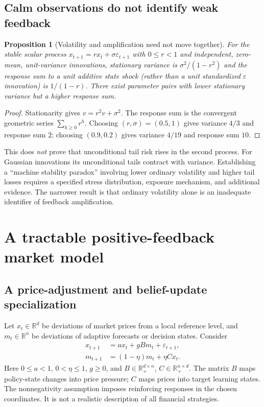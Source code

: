 \documentclass[11pt,a4paper]{article}
\newtheorem{proposition}[theorem]{Proposition}
\theoremstyle{definition}
\theoremstyle{remark}
\newcommand{\R}{\mathbb{R}}
\begin{document}
\subsection{Calm observations do not identify weak feedback}
\begin{proposition}[Volatility and amplification need not move together]
\label{prop:vol}
For the stable scalar process $x_{t+1}=r x_t+\sigma\varepsilon_{t+1}$ with $0\leq r<1$ and independent, zero-mean, unit-variance innovations, stationary variance is $\sigma^2/(1-r^2)$ and the response sum to a unit additive state shock (rather than a unit standardized $\varepsilon$ innovation) is $1/(1-r)$. There exist parameter pairs with lower stationary variance but a higher response sum.
\end{proposition}
\begin{proof}
Stationarity gives $v=r^2v+\sigma^2$. The response sum is the convergent geometric series $\sum_{h\geq0}r^h$. Choosing $(r,\sigma)=(0.5,1)$ gives variance $4/3$ and response sum $2$; choosing $(0.9,0.2)$ gives variance $4/19$ and response sum $10$.
\end{proof}
This does \emph{not} prove that unconditional tail risk rises in the second process. For Gaussian innovations its unconditional tails contract with variance. Establishing a ``machine stability paradox'' involving lower ordinary volatility and higher tail losses requires a specified stress distribution, exposure mechanism, and additional evidence. The narrower result is that ordinary volatility alone is an inadequate identifier of feedback amplification.

\section{A tractable positive-feedback market model}
\label{sec:positive}
\subsection{A price-adjustment and belief-update specialization}
Let $x_t\in\R^d$ be deviations of market prices from a local reference level, and $m_t\in\R^n$ be deviations of adaptive forecasts or decision states. Consider
\begin{align}
 x_{t+1}&=a x_t+gB m_t+\varepsilon_{t+1},\label{eq:positiveprice}\\
 m_{t+1}&=(1-\eta)m_t+\eta C x_t.\label{eq:positivememory}
\end{align}
Here $0\leq a<1$, $0<\eta\leq1$, $g\geq0$, and $B\in\R_+^{d\times n}$, $C\in\R_+^{n\times d}$. The matrix $B$ maps policy-state changes into price pressure; $C$ maps prices into target learning states. The nonnegativity assumption imposes reinforcing responses in the chosen coordinates. It is not a realistic description of all financial strategies.
\end{document}
